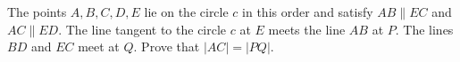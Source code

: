 The points $A, B, C, D, E$ lie on the circle $c$ in this order and satisfy $AB\parallel EC$ and $AC\parallel ED$. The line tangent to the circle $c$ at $E$ meets the line $AB$ at $P$. The lines $BD$ and $EC$ meet at $Q$. Prove that $|AC|=|PQ|$.